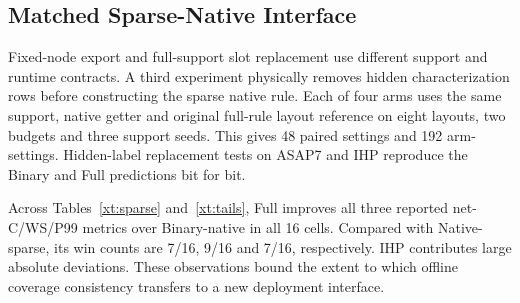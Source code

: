 \subsection{Matched Sparse-Native Interface}
Fixed-node export and full-support slot replacement use different support and runtime contracts. A third experiment physically removes hidden characterization rows before constructing the sparse native rule. Each of four arms uses the same support, native getter and original full-rule layout reference on eight layouts, two budgets and three support seeds. This gives 48 paired settings and 192 arm-settings. Hidden-label replacement tests on ASAP7 and IHP reproduce the Binary and Full predictions bit for bit.

Across Tables~\ref{xt:sparse} and~\ref{xt:tails}, Full improves all three reported net-C/WS/P99 metrics over Binary-native in all 16 cells. Compared with Native-sparse, its win counts are 7/16, 9/16 and 7/16, respectively. IHP contributes large absolute deviations. These observations bound the extent to which offline coverage consistency transfers to a new deployment interface.
\normalsize
